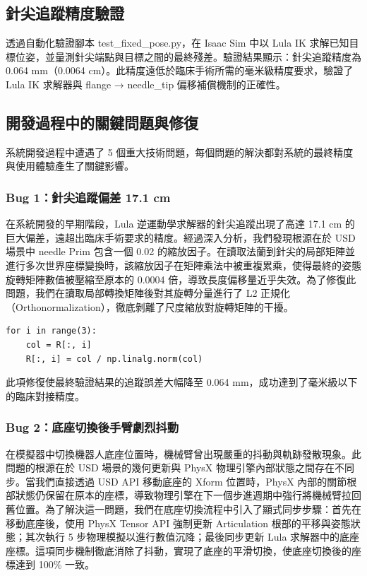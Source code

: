 \documentclass[a4paper, 12pt]{article}
\begin{document}
\subsection{針尖追蹤精度驗證}

透過自動化驗證腳本 test\_fixed\_pose.py，在 Isaac Sim 中以 Lula IK 求解已知目標位姿，並量測針尖端點與目標之間的最終殘差。驗證結果顯示：針尖追蹤精度為 0.064 mm（0.0064 cm）。此精度遠低於臨床手術所需的毫米級精度要求，驗證了 Lula IK 求解器與 flange → needle\_tip 偏移補償機制的正確性。

\subsection{開發過程中的關鍵問題與修復}
\label{subsec:bugfixes}

系統開發過程中遭遇了 5 個重大技術問題，每個問題的解決都對系統的最終精度與使用體驗產生了關鍵影響。

\subsubsection{Bug 1：針尖追蹤偏差 17.1 cm}

在系統開發的早期階段，Lula 逆運動學求解器的針尖追蹤出現了高達 17.1 cm 的巨大偏差，遠超出臨床手術要求的精度。經過深入分析，我們發現根源在於 USD 場景中 needle Prim 包含一個 0.02 的縮放因子。在讀取法蘭到針尖的局部矩陣並進行多次世界座標變換時，該縮放因子在矩陣乘法中被重複累乘，使得最終的姿態旋轉矩陣數值被壓縮至原本的 0.0004 倍，導致長度偏移量近乎失效。為了修復此問題，我們在讀取局部轉換矩陣後對其旋轉分量進行了 L2 正規化（Orthonormalization），徹底剝離了尺度縮放對旋轉矩陣的干擾。
\begin{lstlisting}[caption={旋轉矩陣正規化}]
for i in range(3):
    col = R[:, i]
    R[:, i] = col / np.linalg.norm(col)
\end{lstlisting}
此項修復使最終驗證結果的追蹤誤差大幅降至 0.064 mm，成功達到了毫米級以下的臨床對接精度。

\subsubsection{Bug 2：底座切換後手臂劇烈抖動}

在模擬器中切換機器人底座位置時，機械臂曾出現嚴重的抖動與軌跡發散現象。此問題的根源在於 USD 場景的幾何更新與 PhysX 物理引擎內部狀態之間存在不同步。當我們直接透過 USD API 移動底座的 Xform 位置時，PhysX 內部的關節根部狀態仍保留在原本的座標，導致物理引擎在下一個步進週期中強行將機械臂拉回舊位置。為了解決這一問題，我們在底座切換流程中引入了顯式同步步驟：首先在移動底座後，使用 PhysX Tensor API 強制更新 Articulation 根部的平移與姿態狀態；其次執行 5 步物理模擬以進行數值沉降；最後同步更新 Lula 求解器中的底座座標。這項同步機制徹底消除了抖動，實現了底座的平滑切換，使底座切換後的座標達到 100\% 一致。
\end{document}

